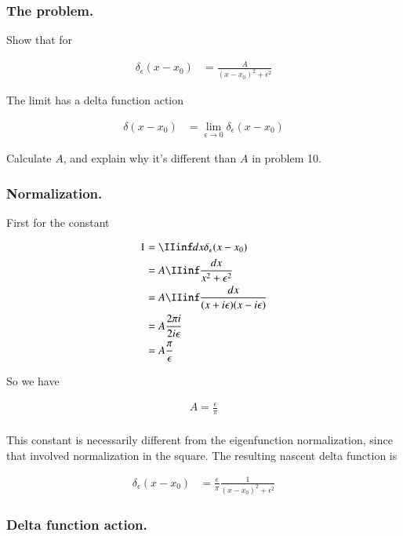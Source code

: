 \documentclass{article}
\begin{document}
\subsubsection{The problem. }

Show that for

\begin{align*}
\delta_\epsilon(x - x_0) &= \frac{A}{(x-x_0)^2 + \epsilon^2}
\end{align*}

The limit has a delta function action

\begin{align*}
\delta(x - x_0) &= \lim_{\epsilon \rightarrow 0} \delta_\epsilon(x - x_0)
\end{align*}

Calculate $A$, and explain why it's different than $A$ in problem 10.

\subsubsection{Normalization. }

First for the constant

\begin{align*}
1 &= \IIinf dx \delta_\epsilon(x - x_0) \\
&= A \IIinf \frac{dx}{x^2 + \epsilon^2} \\
&= A \IIinf \frac{dx}{(x + i\epsilon)(x - i \epsilon)} \\
&= A \frac{2 \pi i}{ 2 i \epsilon } \\
&= A \frac{\pi}{\epsilon } \\
\end{align*}

So we have

\begin{align*}
A = \frac{\epsilon }{\pi} \\
\end{align*}

This constant is necessarily different from the eigenfunction normalization, since that involved normalization in the square.  The resulting 
nascent delta function is

\begin{align*}
\delta_\epsilon(x - x_0) &= \frac{\epsilon }{\pi} \frac{1}{(x-x_0)^2 + \epsilon^2}
\end{align*}

\subsubsection{Delta function action. }
\end{document}
